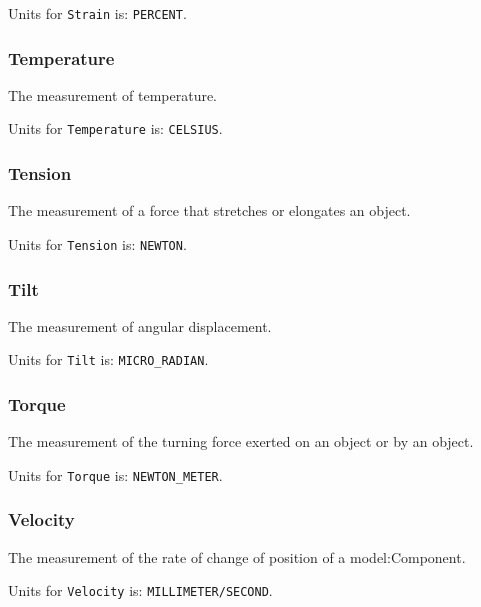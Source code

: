 Units for \texttt{Strain} is: \texttt{PERCENT}.

\FloatBarrier

\subsubsection{Temperature}
  \label{sec:Temperature}


The measurement of temperature.


Units for \texttt{Temperature} is: \texttt{CELSIUS}.

\FloatBarrier

\subsubsection{Tension}
  \label{sec:Tension}


The measurement of a force that stretches or elongates an object.


Units for \texttt{Tension} is: \texttt{NEWTON}.

\FloatBarrier

\subsubsection{Tilt}
  \label{sec:Tilt}


The measurement of angular displacement.


Units for \texttt{Tilt} is: \texttt{MICRO_RADIAN}.

\FloatBarrier

\subsubsection{Torque}
  \label{sec:Torque}


The measurement of the turning force exerted on an object or by an object.


Units for \texttt{Torque} is: \texttt{NEWTON_METER}.

\FloatBarrier

\subsubsection{Velocity}
  \label{sec:Velocity}


The measurement of the rate of change of position of a {model:Component}.


Units for \texttt{Velocity} is: \texttt{MILLIMETER/SECOND}.

\FloatBarrier

